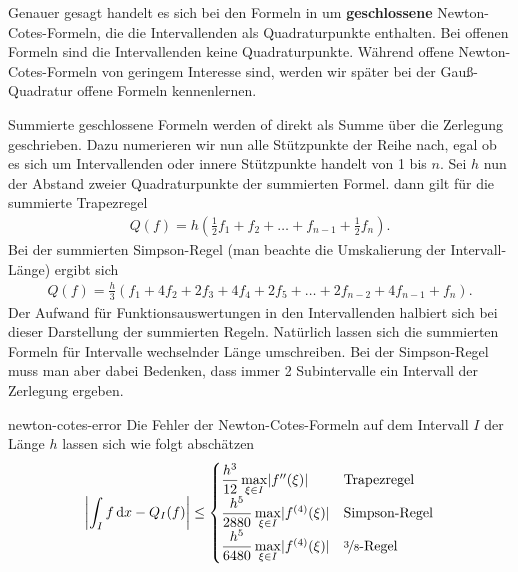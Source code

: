 \begin{remark}
  Genauer gesagt handelt es sich bei den Formeln in
   um \textbf{geschlossene}
  Newton-Cotes-Formeln, die die Intervallenden als Quadraturpunkte
  enthalten.  Bei offenen Formeln sind die Intervallenden keine
  Quadraturpunkte. Während offene Newton-Cotes-Formeln von geringem
  Interesse sind, werden wir später bei der Gauß-Quadratur offene
  Formeln kennenlernen.

  Summierte geschlossene Formeln werden of direkt als Summe über die
  Zerlegung geschrieben. Dazu numerieren wir nun alle Stützpunkte der
  Reihe nach, egal ob es sich um Intervallenden oder innere
  Stützpunkte handelt von 1 bis $n$. Sei $h$ nun der Abstand zweier Quadraturpunkte
  der summierten Formel. dann gilt für die summierte Trapezregel
  \begin{gather}
    Q(f) = h\left(\tfrac12 f_1 + f_2 +\dots+f_{n-1}+\tfrac12 f_n\right).
  \end{gather}
  Bei der summierten Simpson-Regel (man beachte die Umskalierung der Intervall-Länge) ergibt sich
  \begin{gather}
    Q(f) = \tfrac h3\left(f_1 + 4 f_2 + 2 f_3 + 4 f_4 + 2 f_5
      + \dots + 2 f_{n-2} + 4 f_{n-1} + f_{n}\right).
  \end{gather}
  Der Aufwand für Funktionsauswertungen in den Intervallenden halbiert
  sich bei dieser Darstellung der summierten Regeln. Natürlich lassen
  sich die summierten Formeln für Intervalle wechselnder Länge
  umschreiben. Bei der Simpson-Regel muss man aber dabei Bedenken,
  dass immer 2 Subintervalle ein Intervall der Zerlegung ergeben.
\end{remark}


\begin{Satz}{newton-cotes-error}
  Die Fehler der Newton-Cotes-Formeln auf dem Intervall $I$ der Länge
  $h$ lassen sich wie folgt abschätzen
  \begin{gather}
    \left|\int_I f\,\mathrm{d} x - Q_I(f)\right| \le
    \begin{cases}
      \dfrac{h^3}{12}\max\limits_{\xi\in I}\lvert f''(\xi)\rvert
      &\text{Trapezregel}\\
      \dfrac{h^5}{2880}\max\limits_{\xi\in I}\lvert f^{(4)}(\xi)\rvert
      &\text{Simpson-Regel}\\
      \dfrac{h^5}{6480}\max\limits_{\xi\in I}\lvert f^{(4)}(\xi)\rvert
      &\text{\nicefrac38-Regel}
    \end{cases}
  \end{gather}
\end{Satz}


